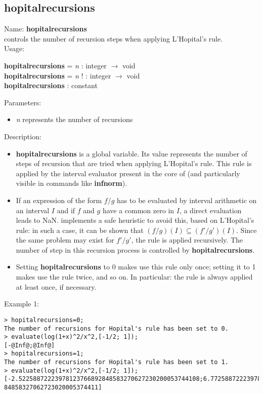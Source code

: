 \subsection{hopitalrecursions}
\label{labhopitalrecursions}
\noindent Name: \textbf{hopitalrecursions}\\
controls the number of recursion steps when applying L'Hopital's rule.\\
\noindent Usage: 
\begin{center}
\textbf{hopitalrecursions} = \emph{n} : \textsf{integer} $\rightarrow$ \textsf{void}\\
\textbf{hopitalrecursions} = \emph{n} ! : \textsf{integer} $\rightarrow$ \textsf{void}\\
\textbf{hopitalrecursions} : \textsf{constant}\\
\end{center}
Parameters: 
\begin{itemize}
\item \emph{n} represents the number of recursions
\end{itemize}
\noindent Description: \begin{itemize}

\item \textbf{hopitalrecursions} is a global variable. Its value represents the number of steps of
   recursion that are tried when applying L'Hopital's rule. This rule is applied
   by the interval evaluator present in the core of \sollya (and particularly
   visible in commands like \textbf{infnorm}).

\item If an expression of the form $f/g$ has to be evaluated by interval 
   arithmetic on an interval $I$ and if $f$ and $g$ have a common zero
   in $I$, a direct evaluation leads to NaN.
   \sollya implements a safe heuristic to avoid this, based on L'Hopital's rule: in 
   such a case, it can be shown that $(f/g)(I) \subseteq (f'/g')(I)$. Since
   the same problem may exist for $f'/g'$, the rule is applied recursively.
   The number of step in this recursion process is controlled by \textbf{hopitalrecursions}.

\item Setting \textbf{hopitalrecursions} to 0 makes \sollya use this rule only once;
   setting it to 1 makes \sollya use the rule twice, and so on.
   In particular: the rule is always applied at least once, if necessary.
\end{itemize}
\noindent Example 1: 
\begin{center}\begin{minipage}{15cm}\begin{Verbatim}[frame=single]
> hopitalrecursions=0;
The number of recursions for Hopital's rule has been set to 0.
> evaluate(log(1+x)^2/x^2,[-1/2; 1]);
[-@Inf@;@Inf@]
> hopitalrecursions=1;
The number of recursions for Hopital's rule has been set to 1.
> evaluate(log(1+x)^2/x^2,[-1/2; 1]);
[-2.52258872223978123766892848583270627230200053744108;6.77258872223978123766892
84858327062723020005374411]
\end{Verbatim}
\end{minipage}\end{center}
